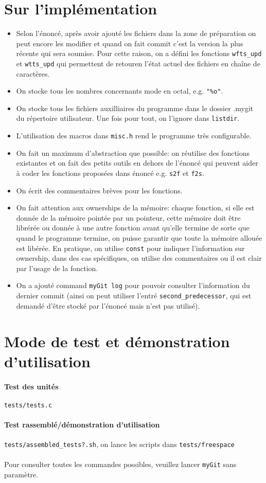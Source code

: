 \documentclass{report}
\begin{document}
\section*{Sur l'implémentation}
\begin{itemize}
  \item Selon l'énoncé, après avoir ajouté les fichiers dans la zone de préparation on peut encore les modifier et quand on
  fait commit c'est la version la plus récente qui sera soumise. Pour cette raison, on a défini les
  fonctions \verb|wfts_upd| et \verb|wtts_upd| qui permettent de retouren l'état actuel des fichiers en chaîne de caractères.
  \item On stocke tous les nombres concernants mode en octal, e.g. \verb|"%o"|.
  \item On stocke tous les fichiers auxilliaires du programme dans le dossier .mygit
  du répertoire utilisateur. Une fois pour tout, on l'ignore dans \verb|listdir|.
  \item L'utilisation des macros dans \verb|misc.h| rend le programme très configurable.
  \item On fait un maximum d'abstraction que possible: on réutilise des fonctions existantes et
  on fait des petits outils en dehors de l'énoncé qui peuvent aider à coder les fonctions proposées dans énoncé e.g. \verb|s2f| et \verb|f2s|.
  \item On écrit des commentaires brèves pour les fonctions.
  \item On fait attention aux ownerships de la mémoire: chaque fonction, si elle est donnée de la mémoire pointée
  par un pointeur, cette mémoire doit être librérée ou donnée à une autre fonction avant qu'elle termine de sorte
  que quand le programme termine, on puisse garantir que toute la mémoire allouée est libérée. En pratique, on utilise
  \verb|const| pour indiquer l'information sur ownership, dans des cas spécifiques, on utilise des commentaires ou il est
  clair par l'usage de la fonction.
  \item On a ajouté command \verb|myGit log| pour pouvoir consulter l'information du dernier commit (ainsi on
  peut utiliser l'entré \verb|second_predecessor|, qui est demandé d'être stocké par l'énoncé mais n'est pas utilisé).
\end{itemize}

\section*{Mode de test et démonstration d'utilisation}

\paragraph{Test des unités} \verb|tests/tests.c|
\paragraph{Test rassemblé/démonstration d'utilisation}\verb|tests/assembled_tests?.sh|, 
on lance les scripts dans \verb|tests/freespace|

\paragraph{}Pour consulter toutes les commandes possibles, veuillez lancer \verb|myGit| sans paramètre.
\end{document}
